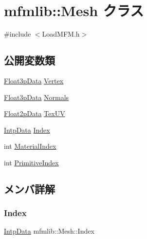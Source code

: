 \hypertarget{classmfmlib_1_1_mesh}{}\section{mfmlib\+:\+:Mesh クラス}
\label{classmfmlib_1_1_mesh}


{\ttfamily \#include $<$Load\+M\+F\+M.\+h$>$}

\subsection*{公開変数類}
\begin{DoxyCompactItemize}
\item 
\mbox{\hyperlink{classmfmlib_1_1_float3p_data}{Float3p\+Data}} \mbox{\hyperlink{classmfmlib_1_1_mesh_aa51a50ca2d51c283769d0efff0122d81}{Vertex}}
\item 
\mbox{\hyperlink{classmfmlib_1_1_float3p_data}{Float3p\+Data}} \mbox{\hyperlink{classmfmlib_1_1_mesh_acc9099d9995b1f42dedc7ad0a4320d69}{Normals}}
\item 
\mbox{\hyperlink{classmfmlib_1_1_float2p_data}{Float2p\+Data}} \mbox{\hyperlink{classmfmlib_1_1_mesh_a8cf113dcdb5f339dbe192072205d9210}{Tex\+UV}}
\item 
\mbox{\hyperlink{classmfmlib_1_1_intp_data}{Intp\+Data}} \mbox{\hyperlink{classmfmlib_1_1_mesh_aa6919522434d9867a885ddfcabb314b1}{Index}}
\item 
int \mbox{\hyperlink{classmfmlib_1_1_mesh_ad9b38a36ca097956b5b98aef018737b2}{Material\+Index}}
\item 
int \mbox{\hyperlink{classmfmlib_1_1_mesh_aae7ea245b25b22be622c58b21c4a2a06}{Primitive\+Index}}
\end{DoxyCompactItemize}


\subsection{メンバ詳解}
\mbox{\label{classmfmlib_1_1_mesh_aa6919522434d9867a885ddfcabb314b1}} 
\subsubsection{\texorpdfstring{Index}{Index}}
{\footnotesize\ttfamily \mbox{\hyperlink{classmfmlib_1_1_intp_data}{Intp\+Data}} mfmlib\+::\+Mesh\+::\+Index}

